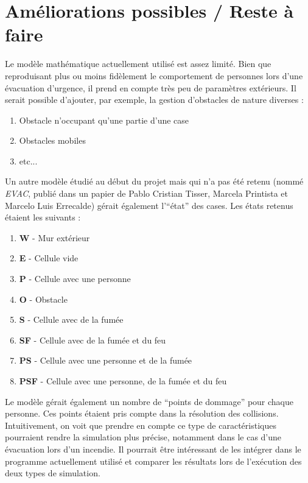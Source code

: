 \section{Améliorations possibles / Reste à faire}
Le modèle mathématique actuellement utilisé est assez limité. Bien que reproduisant plus ou moins fidèlement le comportement de personnes lors d'une évacuation d'urgence, il prend en compte très peu de paramètres extérieurs. Il serait possible d'ajouter, par exemple, la gestion d'obstacles de nature diverses :

	\begin{enumerate}
		\item Obstacle n'occupant qu'une partie d'une case
		\item Obstacles mobiles
		\item etc...
	\end{enumerate}
	
Un autre modèle étudié au début du projet mais qui n'a pas été retenu (nommé \textit{EVAC}, publié dans un papier de Pablo Cristian Tisser, Marcela Printista et Marcelo Luis Errecalde) gérait également l'``état'' des cases. Les états retenus étaient les suivants : 

	\begin{enumerate}
		\item \textbf{W} - Mur extérieur
		\item \textbf{E} - Cellule vide
		\item \textbf{P} - Cellule avec une personne
		\item \textbf{O} - Obstacle
		\item \textbf{S} - Cellule avec de la fumée
		\item \textbf{SF} - Cellule avec de la fumée et du feu
		\item \textbf{PS} - Cellule avec une personne et de la fumée
		\item \textbf{PSF} - Cellule avec une personne, de la fumée et du feu
	\end{enumerate}
	
Le modèle gérait également un nombre de ``points de dommage'' pour chaque personne. Ces points étaient pris compte dans la résolution des collisions. Intuitivement, on voit que prendre en compte ce type de caractéristiques pourraient rendre la simulation plus précise, notamment dans le cas d'une évacuation lors d'un incendie. Il pourrait être intéressant de les intégrer dans le programme actuellement utilisé et comparer les résultats lors de l'exécution des deux types de simulation.